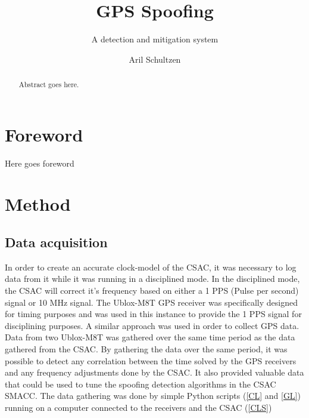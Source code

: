 \documentclass[12pt,english,a4paper]{report}
\title{GPS Spoofing}
\subtitle{A detection and mitigation system}
\author{Aril Schultzen}
\begin{document}
\duoforside[dept={Institutt for informatikk},
program={Informatikk: programmering og nettverk},
long]

\begin{abstract}
Abstract goes here.
\end{abstract}

\chapter*{Foreword}
Here goes foreword

\thispagestyle{empty}
\setcounter{page}{0}
\tableofcontents
\thispagestyle{empty}
\setcounter{page}{0}
\thispagestyle{empty}
\setcounter{page}{0}
\clearpage
\setcounter{page}{1}





\newpage
\chapter{Method}
\section{Data acquisition}
In order to create an accurate clock-model of the CSAC, it was necessary to log data from it while it was running in a disciplined mode. In the disciplined mode, the CSAC will correct it's frequency based on either a 1 PPS (Pulse per second) signal or 10 MHz signal. The Ublox-M8T GPS receiver was specifically designed for timing purposes and was used in this instance to provide the 1 PPS signal for disciplining purposes. A similar approach was used in order to collect GPS data. Data from two Ublox-M8T was gathered over the same time period as the data gathered from the CSAC. By gathering the data over the same period, it was possible to detect any correlation between the time solved by the GPS receivers and any frequency adjustments done by the CSAC. It also provided valuable data that could be used to tune the spoofing detection algorithms in the CSAC SMACC. The data gathering was done by simple Python scripts (\ref{CL} and \ref{GL}) running on a computer connected to the receivers and the CSAC (\ref{CLS})

\newpage
\end{document}
